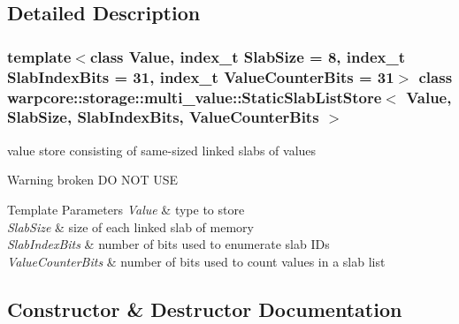 \subsection{Detailed Description}
\subsubsection*{template$<$class Value, index\+\_\+t Slab\+Size = 8, index\+\_\+t Slab\+Index\+Bits = 31, index\+\_\+t Value\+Counter\+Bits = 31$>$\newline
class warpcore\+::storage\+::multi\+\_\+value\+::\+Static\+Slab\+List\+Store$<$ Value, Slab\+Size, Slab\+Index\+Bits, Value\+Counter\+Bits $>$}

value store consisting of same-\/sized linked slabs of values 

\begin{DoxyWarning}{Warning}
broken DO N\+OT U\+SE 
\end{DoxyWarning}

\begin{DoxyTemplParams}{Template Parameters}
{\em Value} & type to store \\
\hline
{\em Slab\+Size} & size of each linked slab of memory \\
\hline
{\em Slab\+Index\+Bits} & number of bits used to enumerate slab I\+Ds \\
\hline
{\em Value\+Counter\+Bits} & number of bits used to count values in a slab list \\
\hline
\end{DoxyTemplParams}


\subsection{Constructor \& Destructor Documentation}
\mbox{\label{classwarpcore_1_1storage_1_1multi__value_1_1StaticSlabListStore_a7e7a89e7aec237c5cf8a400721f7b35e}} 

